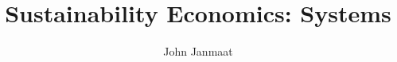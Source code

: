 \documentclass[10pt, aspectratio=169]{beamer}
\title{Sustainability Economics: Systems}
\author{John Janmaat}
\begin{document}
	
	\frame{\titlepage}
	
	
	
\end{document}
